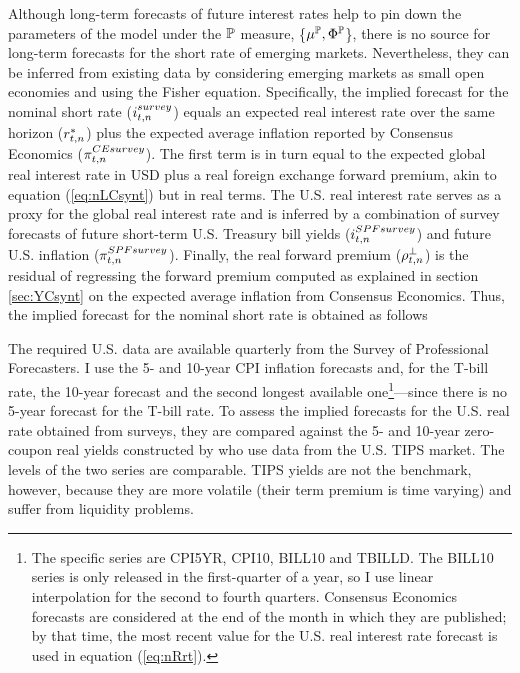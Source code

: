 {Although long-term forecasts of future interest rates help to pin down the parameters of the model under the \(\mathbb{P}\) measure, \{\(\mu^{\mathbb{P}}, \Phi^{\mathbb{P}}\)\}, there is no source for long-term forecasts for the short rate of emerging markets. 
Nevertheless, they can be inferred from existing data by considering emerging markets as small open economies and using the Fisher equation.  
Specifically, the implied forecast for the nominal short rate (\(i_{t,n}^{survey}\)) equals an expected real interest rate over the same horizon (\(r_{t,n}^{*}\)) plus the expected average inflation reported by Consensus Economics (\(\pi^{CE survey}_{t,n}\)). 
The first term is in turn equal to the expected global real interest rate in USD plus a real foreign exchange forward premium, akin to equation (\ref{eq:nLCsynt}) but in real terms.
The U.S. real interest rate serves as a proxy for the global real interest rate and is inferred by a combination of survey forecasts of future short-term U.S. Treasury bill yields (\(i^{SPF survey}_{t,n}\)) and future U.S. inflation (\(\pi^{SPF survey}_{t,n}\)).
Finally, the real forward premium (\(\rho_{t,n}^{\perp}\)) is the residual of regressing the forward premium computed as explained in section \ref{sec:YCsynt} on the expected average inflation from Consensus Economics. 
Thus, the implied forecast for the nominal short rate is obtained as follows

The required U.S. data are available quarterly from the Survey of Professional Forecasters.
I use the 5- and 10-year CPI inflation forecasts and, for the T-bill rate, the 10-year forecast and the second longest available one\footnote{ The specific series are CPI5YR, CPI10, BILL10 and TBILLD. The BILL10 series is only released in the first-quarter of a year, so I use linear interpolation for the second to fourth quarters. Consensus Economics forecasts are considered at the end of the month in which they are published; by that time, the most recent value for the U.S. real interest rate forecast is used in equation (\ref{eq:nRrt}).}---since there is no 5-year forecast for the T-bill rate. 
To assess the implied forecasts for the U.S. real rate obtained from surveys, they are compared against the 5- and 10-year zero-coupon real yields constructed by \cite{GSW:2010} who use data from the U.S. TIPS market.
The levels of the two series are comparable. 
TIPS yields are not the benchmark, however, because they are more volatile (their term premium is time varying) and suffer from liquidity problems.

}
